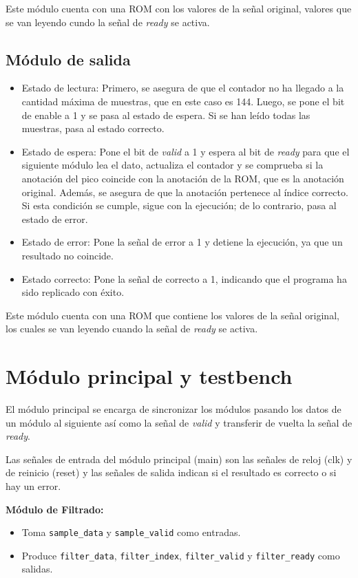 Este módulo cuenta con una ROM con los valores de la señal original, valores que se van leyendo cundo la señal de \textit{ready} se activa.

\subsection{Módulo de salida}
\begin{itemize}
\item Estado de lectura: Primero, se asegura de que el contador no ha llegado a la cantidad máxima de muestras, que en este caso es 144. Luego, se pone el bit de enable a 1 y se pasa al estado de espera. Si se han leído todas las muestras, pasa al estado correcto.
\item Estado de espera: Pone el bit de \textit{valid} a 1 y espera al bit de \textit{ready} para que el siguiente módulo lea el dato, actualiza el contador y se comprueba si la anotación del pico coincide con la anotación de la ROM, que es la anotación original. Además, se asegura de que la anotación pertenece al índice correcto. Si esta condición se cumple, sigue con la ejecución; de lo contrario, pasa al estado de error.
\item Estado de error: Pone la señal de error a 1 y detiene la ejecución, ya que un resultado no coincide.
\item Estado correcto: Pone la señal de correcto a 1, indicando que el programa ha sido replicado con éxito.
\end{itemize}

Este módulo cuenta con una ROM que contiene los valores de la señal original, los cuales se van leyendo cuando la señal de \textit{ready} se activa.
\section{Módulo principal y testbench}

El módulo principal se encarga de sincronizar los módulos pasando los datos de un módulo al siguiente así como la señal de \textit{valid} y transferir de vuelta la señal de \textit{ready}.

Las señales de entrada del módulo principal (main) son las señales de reloj (clk) y de reinicio (reset) y las señales de salida indican si el resultado es correcto o si hay un error.

\textbf{Módulo de Filtrado:}
\begin{itemize}
    \item Toma \texttt{sample\_data} y \texttt{sample\_valid} como entradas.
    \item Produce \texttt{filter\_data}, \texttt{filter\_index}, \texttt{filter\_valid} y \texttt{filter\_ready} como salidas.
\end{itemize}

